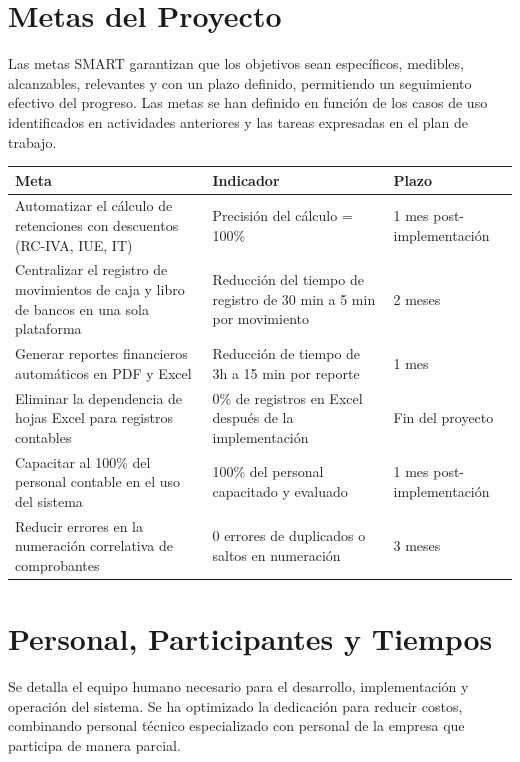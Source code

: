 \documentclass[stu]{apa7}
\begin{document}
\section{Metas del Proyecto}

Las metas SMART garantizan que los objetivos sean específicos, medibles, alcanzables, relevantes y con un plazo definido, permitiendo un seguimiento efectivo del progreso. Las metas se han definido en función de los casos de uso identificados en actividades anteriores y las tareas expresadas en el plan de trabajo.

\begin{longtable}{|L{5cm}|L{4cm}|C{3cm}|}
\hline
{}
\textbf{Meta} & \textbf{Indicador} & \textbf{Plazo} \\
\hline
Automatizar el cálculo de retenciones con descuentos (RC-IVA, IUE, IT) & Precisión del cálculo = 100\% & 1 mes post-implementación \\
\hline
Centralizar el registro de movimientos de caja y libro de bancos en una sola plataforma & Reducción del tiempo de registro de 30 min a 5 min por movimiento & 2 meses \\
\hline
Generar reportes financieros automáticos en PDF y Excel & Reducción de tiempo de 3h a 15 min por reporte & 1 mes \\
\hline
Eliminar la dependencia de hojas Excel para registros contables & 0\% de registros en Excel después de la implementación & Fin del proyecto \\
\hline
Capacitar al 100\% del personal contable en el uso del sistema & 100\% del personal capacitado y evaluado & 1 mes post-implementación \\
\hline
Reducir errores en la numeración correlativa de comprobantes & 0 errores de duplicados o saltos en numeración & 3 meses \\
\hline
\end{longtable}

\section{Personal, Participantes y Tiempos}

Se detalla el equipo humano necesario para el desarrollo, implementación y operación del sistema. Se ha optimizado la dedicación para reducir costos, combinando personal técnico especializado con personal de la empresa que participa de manera parcial.
\end{document}
